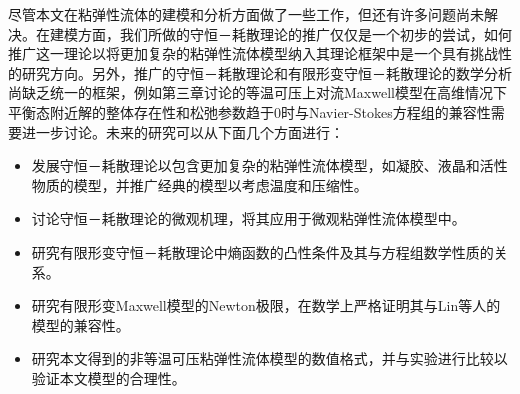 尽管本文在粘弹性流体的建模和分析方面做了一些工作，但还有许多问题尚未解决。在建模方面，我们所做的守恒－耗散理论的推广仅仅是一个初步的尝试，如何推广这一理论以将更加复杂的粘弹性流体模型纳入其理论框架中是一个具有挑战性的研究方向。另外，推广的守恒－耗散理论和有限形变守恒－耗散理论的数学分析尚缺乏统一的框架，例如第三章讨论的等温可压上对流Maxwell模型在高维情况下平衡态附近解的整体存在性和松弛参数趋于$0$时与Navier-Stokes方程组的兼容性需要进一步讨论。未来的研究可以从下面几个方面进行：
\begin{itemize}
	\item 发展守恒－耗散理论以包含更加复杂的粘弹性流体模型，如凝胶、液晶和活性物质的模型，并推广经典的模型以考虑温度和压缩性。
	\item 讨论守恒－耗散理论的微观机理，将其应用于微观粘弹性流体模型中。
	\item 研究有限形变守恒－耗散理论中熵函数的凸性条件及其与方程组数学性质的关系。
	\item 研究有限形变Maxwell模型的Newton极限，在数学上严格证明其与Lin等人的模型的兼容性。	
	\item 研究本文得到的非等温可压粘弹性流体模型的数值格式，并与实验进行比较以验证本文模型的合理性。
\end{itemize}

% 
